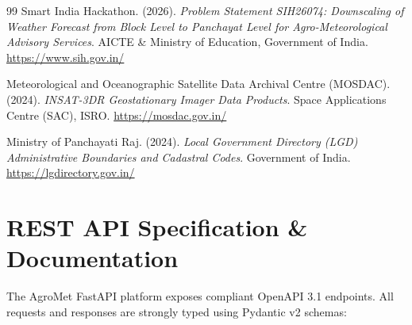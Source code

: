 \documentclass[11pt,a4paper,oneside]{report}
\begin{document}
\begin{thebibliography}{99}
Smart India Hackathon. (2026). \textit{Problem Statement SIH26074: Downscaling of Weather Forecast from Block Level to Panchayat Level for Agro-Meteorological Advisory Services}. AICTE \& Ministry of Education, Government of India. \url{https://www.sih.gov.in/}

Meteorological and Oceanographic Satellite Data Archival Centre (MOSDAC). (2024). \textit{INSAT-3DR Geostationary Imager Data Products}. Space Applications Centre (SAC), ISRO. \url{https://mosdac.gov.in/}

Ministry of Panchayati Raj. (2024). \textit{Local Government Directory (LGD) Administrative Boundaries and Cadastral Codes}. Government of India. \url{https://lgdirectory.gov.in/}

\end{thebibliography}

\newpage
\appendix
\chapter{REST API Specification \& Documentation}

The AgroMet FastAPI platform exposes compliant OpenAPI 3.1 endpoints. All requests and responses are strongly typed using Pydantic v2 schemas:
\end{document}
